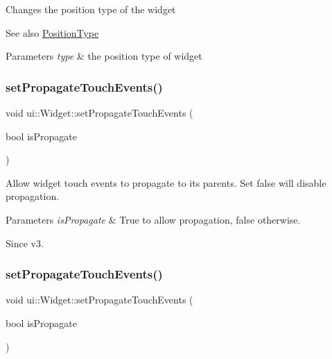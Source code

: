 Changes the position type of the widget

\begin{DoxySeeAlso}{See also}
{\ttfamily \hyperlink{classui_1_1Widget_acfb8004ec169575dab6d3e8eb3e92b90}{Position\+Type}}
\end{DoxySeeAlso}

\begin{DoxyParams}{Parameters}
{\em type} & the position type of widget \\
\hline
\end{DoxyParams}
\mbox{\label{classui_1_1Widget_a3f6b52776496c03a508df35b5cfd28f3}} 
\subsubsection{\texorpdfstring{set\+Propagate\+Touch\+Events()}{setPropagateTouchEvents()}\hspace{0.1cm}{\footnotesize\ttfamily [1/2]}}
{\footnotesize\ttfamily void ui\+::\+Widget\+::set\+Propagate\+Touch\+Events (\begin{DoxyParamCaption}\item[{bool}]{is\+Propagate }\end{DoxyParamCaption})}



Allow widget touch events to propagate to its parents. Set false will disable propagation. 


\begin{DoxyParams}{Parameters}
{\em is\+Propagate} & True to allow propagation, false otherwise. \\
\hline
\end{DoxyParams}
\begin{DoxySince}{Since}
v3. 
\end{DoxySince}
\mbox{\label{classui_1_1Widget_a3f6b52776496c03a508df35b5cfd28f3}} 
\subsubsection{\texorpdfstring{set\+Propagate\+Touch\+Events()}{setPropagateTouchEvents()}\hspace{0.1cm}{\footnotesize\ttfamily [2/2]}}
{\footnotesize\ttfamily void ui\+::\+Widget\+::set\+Propagate\+Touch\+Events (\begin{DoxyParamCaption}\item[{bool}]{is\+Propagate }\end{DoxyParamCaption})}



